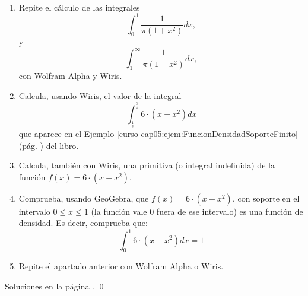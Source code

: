 \documentclass[10pt,a4paper]{article}\usepackage[]{graphicx}\usepackage[]{color}
\begin{document}
\begin{ejercicio}
\label{tut05:ejercicio13}
\quad\\
\begin{enumerate}
  \item Repite el cálculo de las integrales
    \[
        \int_0^1\dfrac{1}{\pi(1+x^2)}dx,
    \]
    y
    \[
        \int_1^{\infty}\dfrac{1}{\pi(1+x^2)}dx,
    \]
    con Wolfram Alpha y Wiris.

  \item Calcula, usando Wiris, el valor de la integral
    \[
    \int_{\frac{1}{2}}^{\frac{3}{4}} 6\cdot(x-x^2) dx
    \]
    que aparece en el Ejemplo \ref{curso-cap05:ejem:FuncionDensidadSoporteFinito} (pág. \pageref{curso-cap05:ejem:FuncionDensidadSoporteFinito}) del libro.

  \item Calcula, también con Wiris, una primitiva (o integral indefinida) de la función $f(x)=6\cdot(x-x^2)$.

  \item Comprueba, usando GeoGebra, que $f(x)=6\cdot(x-x^2)$, con soporte en el intervalo $0\leq x\leq 1$ (la función vale $0$ fuera de ese intervalo) es una función de densidad. Es decir, comprueba que:
    \[
    \int_{0}^{1} 6\cdot(x-x^2) dx = 1
    \]

  \item Repite el apartado anterior con Wolfram Alpha o Wiris.

\end{enumerate}
Soluciones en la página \pageref{tut05:ejercicio13:sol}.
\qed
\end{ejercicio}
\end{document}
